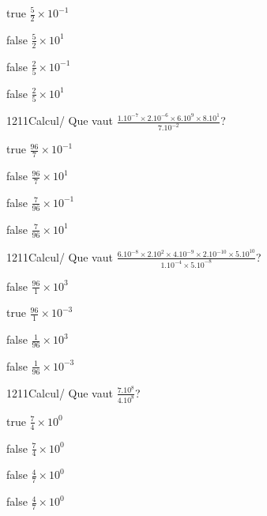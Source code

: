             \begin{reponses}
                \item[true] $\frac{5}{2}\times 10^{-1}$
                \item[false] $\frac{5}{2}\times 10^{1}$
                \item[false] $\frac{2}{5}\times 10^{-1}$
                \item[false] $\frac{2}{5}\times 10^{1}$
            \end{reponses}
            \begin{question}{1211}{Calcul}{}{/}
                Que vaut $\frac{1.10^{-7}\times 2.10^{-6}\times 6.10^{9}\times 8.10^{1}}{7.10^{-2}}$?
            \end{question}
            \begin{reponses}
                \item[true] $\frac{96}{7}\times 10^{-1}$
                \item[false] $\frac{96}{7}\times 10^{1}$
                \item[false] $\frac{7}{96}\times 10^{-1}$
                \item[false] $\frac{7}{96}\times 10^{1}$
            \end{reponses}
            \begin{question}{1211}{Calcul}{}{/}
                Que vaut $\frac{6.10^{-8}\times 2.10^{2}\times 4.10^{-9}\times 2.10^{-10}\times 5.10^{10}}{1.10^{-4}\times 5.10^{-8}}$?
            \end{question}
            \begin{reponses}
                \item[false] $\frac{96}{1}\times 10^{3}$
                \item[true] $\frac{96}{1}\times 10^{-3}$
                \item[false] $\frac{1}{96}\times 10^{3}$
                \item[false] $\frac{1}{96}\times 10^{-3}$
            \end{reponses}
            \begin{question}{1211}{Calcul}{}{/}
                Que vaut $\frac{7.10^{8}}{4.10^{8}}$?
            \end{question}
            \begin{reponses}
                \item[true] $\frac{7}{4}\times 10^{0}$
                \item[false] $\frac{7}{4}\times 10^{0}$
                \item[false] $\frac{4}{7}\times 10^{0}$
                \item[false] $\frac{4}{7}\times 10^{0}$
            \end{reponses}
